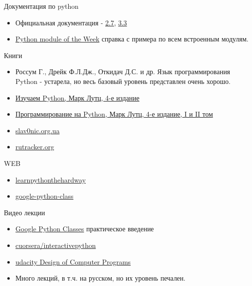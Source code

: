 \documentclass{article}
\begin{document}
\LARGE

\begin{center} Документация по python \end{center}
\begin{itemize}
	\item Официальная документация - \href{http://docs.python.org/2.7/}{2.7}, 
			\href{http://docs.python.org/3.3/}{3.3}
	\item \href{http://www.doughellmann.com/PyMOTW/}{Python module of the Week} 
		  справка с примера по всем встроенным модулям.
\end{itemize}

\begin{center} Книги \end{center}
\begin{itemize}
	\item Россум Г., Дрейк Ф.Л.Дж., Откидач Д.С. и др. Язык программирования Python 
	    - устарела, но весь базовый уровень представлен очень хорошо.
	\item \href{http://rutracker.org/forum/viewtopic.php?t=4130425}{Изучаем Python, Марк Лутц, 4-е издание}
	\item \href{http://rutracker.org/forum/viewtopic.php?t=3958297}{Программирование на Python, Марк Лутц, 4-е издание, I и II том}
    \item \href{http://slav0nic.org.ua/static/books/python/}{slav0nic.org.ua}
    \item \href{http://rutracker.org/forum/viewtopic.php?t=2436308}{rutracker.org}
\end{itemize}

\begin{center} WEB \end{center}
\begin{itemize} 
	\item \href{http://learnpythonthehardway.org/}{learnpythonthehardway}
	\item \href{http://code.google.com/edu/languages/google-python-class/}{google-python-class}
\end{itemize}

\begin{center} Видео лекции \end{center}
\begin{itemize}
	\item \href{http://www.youtube.com/results?search_query=Google+Python+Class}{Google Python Classes} 
	      практическое введение
	\item \href{https://class.coursera.org/interactivepython-2012-001/class/index}{cuorsera/interactivepython}
	\item \href{http://www.udacity.com/overview/Course/cs212/CourseRev/apr2012}{udacity Design of Computer Programs}
	\item Много лекций, в т.ч. на русском, но их уровень печален.
\end{itemize}
\end{document}
